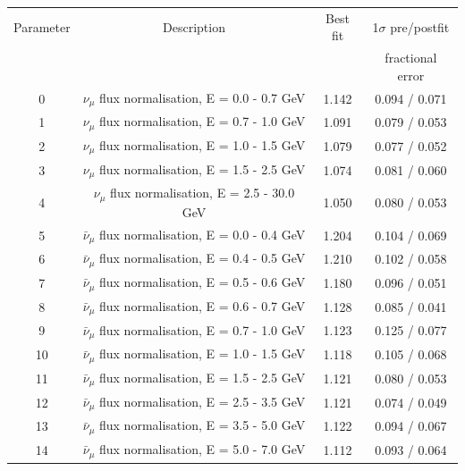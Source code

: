 {
\renewcommand{\arraystretch}{1.2}
\begin{table}
\centering
\begin{tabular}{| c | c | c | c |}
\hline
           Parameter & Description & Best fit & 1$\sigma$ pre/postfit \\
           & & & fractional error \\
\hline
            0 &  $\nu_{\mu}$ flux normalisation, E = 0.0 - 0.7 GeV               & 1.142   & 0.094 / 0.071 \\ 
            1 &  $\nu_{\mu}$ flux normalisation, E = 0.7 - 1.0 GeV               & 1.091   & 0.079 / 0.053 \\ 
            2 &  $\nu_{\mu}$ flux normalisation, E = 1.0 - 1.5 GeV               & 1.079   & 0.077 / 0.052 \\ 
            3 &  $\nu_{\mu}$ flux normalisation, E = 1.5 - 2.5 GeV               & 1.074   & 0.081 / 0.060 \\ 
            4 &  $\nu_{\mu}$ flux normalisation, E = 2.5 - 30.0 GeV              & 1.050   & 0.080 / 0.053 \\ 
            5 &  $\bar{\nu}_{\mu}$ flux normalisation, E = 0.0 - 0.4 GeV         & 1.204   & 0.104 / 0.069 \\ 
            6 &  $\bar{\nu}_{\mu}$ flux normalisation, E = 0.4 - 0.5 GeV         & 1.210   & 0.102 / 0.058 \\ 
            7 &  $\bar{\nu}_{\mu}$ flux normalisation, E = 0.5 - 0.6 GeV         & 1.180   & 0.096 / 0.051 \\ 
            8 &  $\bar{\nu}_{\mu}$ flux normalisation, E = 0.6 - 0.7 GeV         & 1.128   & 0.085 / 0.041 \\ 
            9 &  $\bar{\nu}_{\mu}$ flux normalisation, E = 0.7 - 1.0 GeV         & 1.123   & 0.125 / 0.077 \\ 
           10 &  $\bar{\nu}_{\mu}$ flux normalisation, E = 1.0 - 1.5 GeV         & 1.118   & 0.105 / 0.068 \\ 
           11 &  $\bar{\nu}_{\mu}$ flux normalisation, E = 1.5 - 2.5 GeV         & 1.121   & 0.080 / 0.053 \\ 
           12 &  $\bar{\nu}_{\mu}$ flux normalisation, E = 2.5 - 3.5 GeV         & 1.121   & 0.074 / 0.049 \\ 
           13 &  $\bar{\nu}_{\mu}$ flux normalisation, E = 3.5 - 5.0 GeV         & 1.122   & 0.094 / 0.067 \\ 
           14 &  $\bar{\nu}_{\mu}$ flux normalisation, E = 5.0 - 7.0 GeV         & 1.112   & 0.093 / 0.064 \\ 

\end{tabular}
\end{table}}
